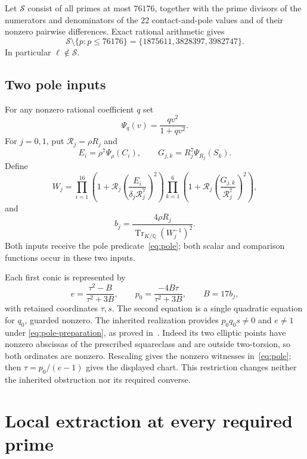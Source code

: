 \documentclass[11pt,a4paper]{article}
\newcommand{\Q}{\mathbb Q}\newcommand{\Z}{\mathbb Z}
\DeclareMathOperator{\Tr}{Tr}
\begin{document}
Let $\mathcal S$ consist of all primes at most $76176$, together
with the prime divisors of the numerators and denominators of the
22 contact-and-pole values and of their nonzero pairwise differences.
Exact rational arithmetic gives
\begin{equation}\label{eq:exceptional}
 \mathcal S\setminus\{p:p\le76176\}
 =\{1875611,3828397,3982747\}.
\end{equation}
In particular $\ell\notin\mathcal S$.

\subsection{Two pole inputs}

For any nonzero rational coefficient $q$ set
\[
 \Psi_q(v)=\frac{qv^2}{1+qv^2}.
\]
For $j=0,1$, put $\mathcal R_j=\rho R_j$ and
\begin{equation}\label{eq:normalized-functions}
 E_i=\rho^7\Psi_\rho(C_i),\qquad
 G_{j,k}=R_j^7\Psi_{R_j}(S_k).
\end{equation}
Define
\begin{equation}\label{eq:W}
 W_j=
 \prod_{i=1}^{16}\left(1+\mathcal R_j
        \left(\frac{E_i}{\delta_j\mathcal R_j^7}\right)^2\right)
 \prod_{k=1}^{6}\left(1+\mathcal R_j
        \left(\frac{G_{j,k}}{\mathcal R_j^7}\right)^2\right),
\end{equation}
and
\begin{equation}\label{eq:pole-inputs}
 b_j=\frac{4\rho R_j}{\Tr_{K/\Q}(W_j^{-1})^2}.
\end{equation}
Both inputs receive the pole predicate~\eqref{eq:pole}; both
scalar and comparison functions occur in these two inputs.

Each first conic is represented by
\[
 e=\frac{\tau^2-B}{\tau^2+3B},\qquad
 p_0=\frac{-4B\tau}{\tau^2+3B},\qquad B=17b_j,
\]
with retained coordinates $\tau,s$. The second equation is a
single quadratic equation for $q_0$, guarded nonzero. The inherited
realization provides $p_0q_0s\ne0$ and $e\ne1$ under
\eqref{eq:pole-preparation}, as proved in~\cite{PointSource}.
Indeed its two elliptic points have nonzero abscissas of the prescribed
squareclass and are outside two-torsion, so both ordinates are
nonzero. Rescaling gives the nonzero witnesses in~\eqref{eq:pole};
then $\tau=p_0/(e-1)$ gives the displayed chart. This restriction
changes neither the inherited obstruction nor its required converse.

\section{Local extraction at every required prime}
\end{document}
